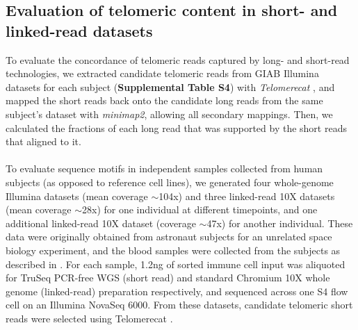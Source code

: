 \documentclass{article}
\begin{document}
\subsection*{Evaluation of telomeric content in short- and linked-read datasets}
    To evaluate the concordance of telomeric reads captured by long- and short-read technologies,
        we extracted candidate telomeric reads from GIAB Illumina datasets for each subject (\textbf{Supplemental Table S4})
            with \textit{Telomerecat} \cite{telomerecat},
            and mapped the short reads back onto the candidate long reads from the same subject's dataset with \textit{minimap2},
            allowing all secondary mappings.
        Then, we calculated the fractions of each long read that was supported by the short reads that aligned to it.
    \\~\\
    To evaluate sequence motifs in independent samples collected from human subjects (as opposed to reference cell lines),
        we generated four whole-genome Illumina datasets (mean coverage $\sim$104x)
        and three linked-read 10X datasets (mean coverage $\sim$28x) for one individual at different timepoints,
        and one additional linked-read 10X dataset (coverage $\sim$47x) for another individual.
    These data were originally obtained from astronaut subjects for an unrelated space biology experiment,
        and the blood samples were collected from the subjects as described in \cite{twins_study}.
        For each sample, 1.2ng of sorted immune cell input was aliquoted for
            TruSeq PCR-free WGS (short read) and standard Chromium 10X whole genome (linked-read) preparation respectively,
            and sequenced across one S4 flow cell on an Illumina NovaSeq 6000.
    From these datasets, candidate telomeric short reads were selected using Telomerecat \cite{telomerecat}.
\end{document}
